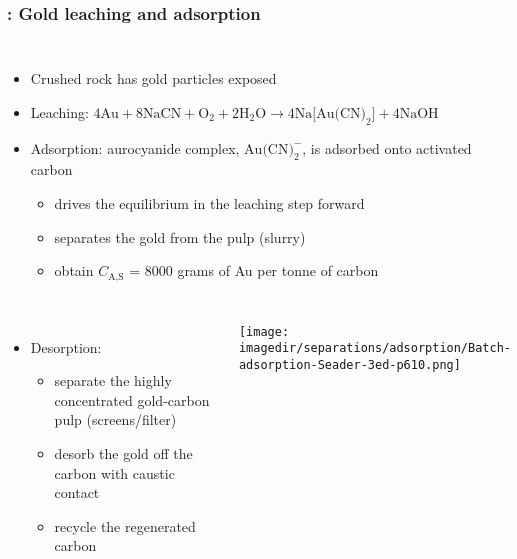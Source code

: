 \begin{frame}\frametitle{{\color{myOrange}{Example}}: Gold leaching and adsorption}
	\begin{columns}[c]
			\begin{itemize}
				\item	Crushed rock has gold particles exposed
				\item	Leaching: $4\text{Au} + 8\text{NaCN} + \text{O}_2 + 2 \text{H}_2\text{O} \longrightarrow  4 \text{Na[Au(CN)}_2\text{]} + 4 \text{NaOH}$
				\item	Adsorption: aurocyanide complex, $\text{Au(CN)}_2^{-}$, is adsorbed onto activated carbon
					\begin{itemize}
						\item	drives the equilibrium in the leaching step forward
						\item	separates the gold from the pulp (slurry)
						\item	obtain $C_\text{A,S}$ = 8000 grams of Au per tonne of carbon
					\end{itemize}
			\end{itemize}
	\end{columns}
	\begin{columns}[t]
			\begin{itemize}
				\item	Desorption:
					\begin{itemize}
						\item	separate the highly concentrated gold-carbon pulp (screens/filter)
						\item	desorb the gold off the carbon with caustic contact
						\item	recycle the regenerated carbon
					\end{itemize}
			\end{itemize}
			\begin{center}
				\texttt{[image: \\imagedir/separations/adsorption/Batch-adsorption-Seader-3ed-p610.png]}
			\end{center}
	\end{columns}
\end{frame}

